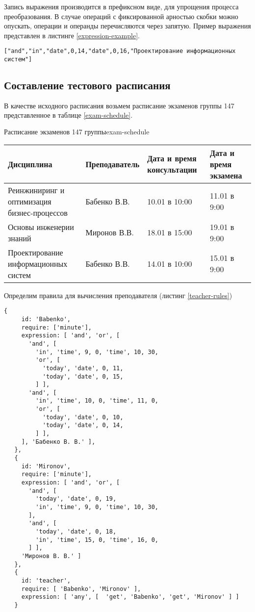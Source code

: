 Запись выражения производится в префиксном виде, для упрощения процесса преобразования.
В случае операций с фиксированной арностью скобки можно опускать, операции и операнды перечисляются через запятую.
Пример выражения представлен в листинге \ref{expression-example}.

\begin{lstlisting}[caption={Пример выражения в строковом представлении},label={expression-example}]
  ["and","in","date",0,14,"date",0,16,"Проектирование информационных систем"]
\end{lstlisting}

\subsection{Составление тестового расписания}

В качестве исходного расписания возьмем расписание экзаменов группы 147 представленное в таблице \ref{exam-schedule}.

\begin{tbl}{Расписание экзаменов 147 группы}{exam-schedule}
  \begin{tabularx}{\textwidth}{| X | p{3cm} | p{3cm} | p{3cm} |}
    \hline Дисциплина
    & Преподаватель
    & Дата и время консультации
    & Дата и время экзамена \\
    \hline Реинжиниринг и оптимизация бизнес-процессов
    & Бабенко В.В.
    & 10.01 в 10:00
    & 11.01 в 9:00 \\
    \hline Основы инженерии знаний
    & Миронов В.В.
    & 18.01 в 15:00
    & 19.01 в 9:00 \\
    \hline Проектирование информационных систем
    & Бабенко В.В.
    & 14.01 в 10:00
    & 15.01 в 9:00 \\
    \hline
  \end{tabularx}
\end{tbl}

Определим правила для вычисления преподавателя (листинг \ref{teacher-rules})

\begin{lstlisting}[caption={Правила для вычисления преподавателя},label={teacher-rules}]
  {
     id: 'Babenko',
     require: ['minute'],
     expression: [ 'and', 'or', [
       'and', [
         'in', 'time', 9, 0, 'time', 10, 30,
         'or', [
           'today', 'date', 0, 11,
           'today', 'date', 0, 15,
         ] ],
       'and', [
         'in', 'time', 10, 0, 'time', 11, 0,
         'or', [
           'today', 'date', 0, 10,
           'today', 'date', 0, 14,
         ] ],
     ], 'Бабенко В. В.' ],
   },
   {
     id: 'Mironov',
     require: ['minute'],
     expression: [ 'and', 'or', [
       'and', [
         'today', 'date', 0, 19,
         'in', 'time', 9, 0, 'time', 10, 30,
       ],
       'and', [
         'today', 'date', 0, 18,
         'in', 'time', 15, 0, 'time', 16, 0,
       ] ],
     'Миронов В. В.' ]
   },
   {
     id: 'teacher',
     require: [ 'Babenko', 'Mironov' ],
     expression: [ 'any', [  'get', 'Babenko', 'get', 'Mironov' ] ]
   }
\end{lstlisting}

